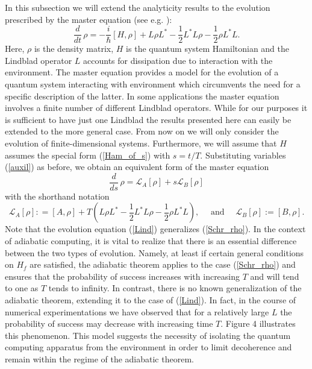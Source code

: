 \documentclass[11 pt]{article}
\begin{document}
In this subsection we will extend the analyticity results to the evolution prescribed by the master equation (see e.g. \cite{Percival}):
\[
\frac{d}{dt}\,\rho = - \frac{i}{\hbar} [H,\rho] + L\rho L^* - \frac{1}{2} L^*L\rho - \frac{1}{2} \rho L^*L .
\]
Here, $\rho$ is the density matrix, $H$ is the quantum system Hamiltonian and the Lindblad operator $L$ accounts for dissipation due to interaction with the environment. The master equation provides a model for the evolution of a quantum system interacting with environment which circumvents the need for a specific description of the latter. In some applications the master equation involves a finite number of different Lindblad operators. While for our purposes it is sufficient to have just one Lindblad the results presented here can easily be extended to the more general case. From now on we will only consider the evolution of finite-dimensional systems. Furthermore, we will assume that $H$ assumes the special form (\ref{Ham_of_s}) with $s = t/T$. Substituting variables (\ref{auxil}) as before, we obtain an equivalent form of the master equation
 \begin{equation}\label{Lind}
 \frac{d}{ds}\,\rho =  \mathcal{L}_A [\rho] + s \mathcal{L}_B [\rho]
 \end{equation}
 with the shorthand notation
 \begin{equation}\label{def_LA}
 \mathcal{L}_A [\rho]: = [A, \rho] + T\left(L\rho L^* - \frac{1}{2} L^*L\rho - \frac{1}{2} \rho L^*L \right), \quad \mbox{ and } \quad
  \mathcal{L}_B [\rho] := [B, \rho].
 \end{equation}
Note that the evolution equation (\ref{Lind}) generalizes (\ref{Schr_rho}). In the context of adiabatic computing, it is vital to realize that there is an essential difference between the two types of evolution. Namely, at least if certain general conditions on $H_f$ are satisfied, the adiabatic theorem applies to the case (\ref{Schr_rho}) and ensures that the probability of success increases with increasing $T$ and will tend to one as $T$ tends to infinity. In contrast, there is no known generalization of the adiabatic theorem, extending it to the case of (\ref{Lind}). In fact, in the course of numerical experimentations we have observed that for a relatively large $L$ the probability of success may decrease with increasing time $T$. Figure 4 illustrates this phenomenon. This model suggests the necessity of isolating the quantum computing apparatus from the environment in order to limit decoherence and remain within the regime of the adiabatic theorem.
\end{document}
